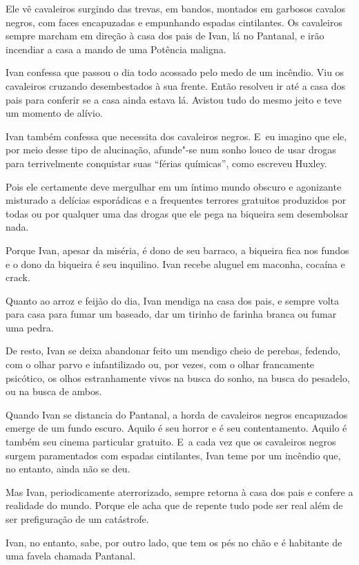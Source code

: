 Ele vê cavaleiros surgindo das trevas, em bandos, montados em garbosos
cavalos negros, com faces encapuzadas e empunhando espadas cintilantes.
Os cavaleiros sempre marcham em direção à casa dos pais de Ivan, lá no
Pantanal, e irão incendiar a casa a mando de uma Potência maligna.

Ivan confessa que passou o dia todo acossado pelo medo de um incêndio.
Viu os cavaleiros cruzando desembestados à sua frente. Então resolveu ir
até a casa dos pais para conferir se a casa ainda estava lá. Avistou
tudo do mesmo jeito e teve um momento de alívio.

Ivan também confessa que necessita dos cavaleiros negros. E~eu imagino
que ele, por meio desse tipo de alucinação, afunde"-se num sonho louco de
usar drogas para terrivelmente conquistar suas ``férias químicas'', como
escreveu Huxley.

Pois ele certamente deve mergulhar em um íntimo mundo obscuro e
agonizante misturado a delícias esporádicas e a frequentes terrores
gratuitos produzidos por todas ou por qualquer uma das drogas que ele
pega na biqueira sem desembolsar nada.

Porque Ivan, apesar da miséria, é dono de seu barraco, a biqueira fica
nos fundos e o dono da biqueira é seu inquilino. Ivan recebe aluguel em
maconha, cocaína e crack.

Quanto ao arroz e feijão do dia, Ivan mendiga na casa dos pais, e sempre
volta para casa para fumar um baseado, dar um tirinho de farinha branca
ou fumar uma pedra.

De resto, Ivan se deixa abandonar feito um mendigo cheio de perebas,
fedendo, com o olhar parvo e infantilizado ou, por vezes, com o olhar
francamente psicótico, os olhos estranhamente vivos na busca do sonho,
na busca do pesadelo, ou na busca de ambos.

\asterisc{}

Quando Ivan se distancia do Pantanal, a horda de cavaleiros negros
encapuzados emerge de um fundo escuro. Aquilo é seu horror e é seu
contentamento. Aquilo é também seu cinema particular gratuito. E~a cada
vez que os cavaleiros negros surgem paramentados com espadas
cintilantes, Ivan teme por um incêndio que, no entanto, ainda não se
deu.

Mas Ivan, periodicamente aterrorizado, sempre retorna à casa dos pais e
confere a realidade do mundo. Porque ele acha que de repente tudo pode
ser real além de ser prefiguração de um catástrofe.

Ivan, no entanto, sabe, por outro lado, que tem os pés no chão e é
habitante de uma favela chamada Pantanal.

